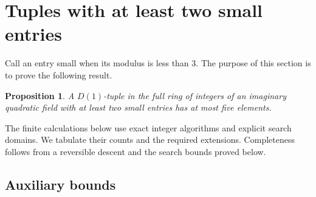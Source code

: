 \documentclass[12pt]{article}
\newtheorem{proposition}[theorem]{Proposition}
\numberwithin{equation}{section}
\begin{document}
\section{Tuples with at least two small entries}
\label{sec:two-small}
Call an entry small when its modulus is less than $3$.
The purpose of this section is to prove the following result.
\begin{proposition}\label{sm:main}
A $D(1)$-tuple in the full ring of integers of an imaginary quadratic
field with at least two small entries has at most five elements.
\end{proposition}
The finite calculations below use exact integer algorithms and explicit
search domains. We tabulate their counts and the required extensions.
Completeness follows from a reversible descent and the search bounds proved below.

\subsection{Auxiliary bounds}
\end{document}
